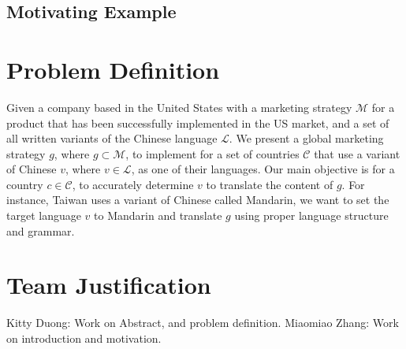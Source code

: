 \documentclass[sigconf]{acmart}
\begin{document}
\subsection{Motivating Example}

\section{Problem Definition}
Given a company based in the United States with a marketing strategy $\mathcal{M}$ for a product that has been successfully implemented in the US market, and a set of all written variants of the Chinese language $\mathcal{L}$. We present a global marketing strategy $g$, where $g \subset \mathcal{M}$, to implement for a set of countries $\mathcal{C}$ that use a variant of Chinese $v$, where $v \in \mathcal{L}$, as one of their languages. Our main objective is for a country $c \in \mathcal{C}$, to accurately determine $v$ to translate the content of $g$. For instance, Taiwan uses a variant of Chinese called Mandarin, we want to set the target language $v$ to Mandarin and translate $g$ using proper language structure and grammar.

\section{Team Justification}
Kitty Duong: Work on Abstract, and problem definition.
Miaomiao Zhang: Work on introduction and motivation.
\end{document}
